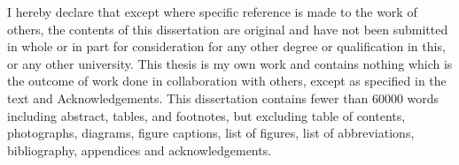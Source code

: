 
\begin{declaration}


    I hereby declare that except where specific reference is made to the work of others, the contents of this dissertation are original and have not been submitted in whole or in part for consideration for any other degree or qualification in this, or any other university. This thesis is my own work and contains nothing which is the outcome of work done in collaboration with others, except as specified in the text and Acknowledgements. This dissertation contains fewer than \num{60000} words including abstract, tables, and footnotes, but excluding table of contents, photographs, diagrams, figure captions, list of figures, list of abbreviations, bibliography, appendices and acknowledgements.
    
    \citet{2021A&A...650A..98W}
    \citet{2021MNRAS.508.1686W}
    \citet{2022MNRAS.515.1751W}
    

\end{declaration}

